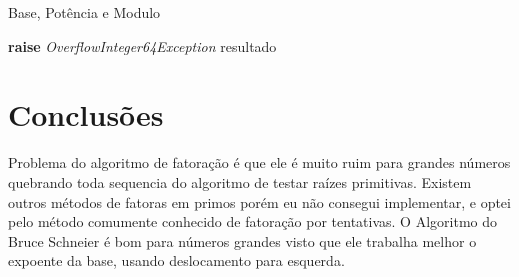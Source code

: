 \documentclass[conference]{IEEEtran}
\begin{document}
\begin{algorithm}
  \caption{Base, Potência e Modulo}\label{powmod}
  \begin{algorithmic}
        \State \textbf{raise} \textit{OverflowInteger64Exception}
      \EndIf
        \EndIf
      \EndWhile
      \Return resultado
    \EndFunction
  \end{algorithmic}
\end{algorithm}

\section{Conclusões}

Problema do algoritmo de fatoração é que ele é muito ruim para grandes números
quebrando toda sequencia do algoritmo de testar raízes primitivas. Existem
outros métodos de fatoras em primos porém eu não consegui implementar, e optei
pelo método comumente conhecido de fatoração por tentativas. O Algoritmo do
Bruce Schneier \cite{schneier} é bom para números grandes visto que ele trabalha
melhor o expoente da base, usando deslocamento para esquerda.
\end{document}
